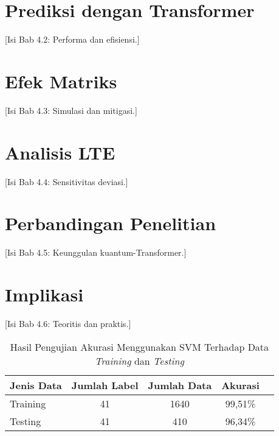 \section{Prediksi dengan Transformer}
[Isi Bab 4.2: Performa dan efisiensi.]

\section{Efek Matriks}
[Isi Bab 4.3: Simulasi dan mitigasi.]

\section{Analisis LTE}
[Isi Bab 4.4: Sensitivitas deviasi.]

\section{Perbandingan Penelitian}
[Isi Bab 4.5: Keunggulan kuantum-Transformer.]

\section{Implikasi}
[Isi Bab 4.6: Teoritis dan praktis.]


\begin{table}[H]
    \centering
    \caption{Hasil Pengujian Akurasi Menggunakan SVM Terhadap Data \textit{Training} dan \textit{Testing}}
    \label{tb_detail_akurasi_face}
    \begin{tabular}{lcccc}
    \toprule
    \textbf{Jenis Data} & \textbf{Jumlah Label} & \textbf{Jumlah Data} & {\color[HTML]{000000} \textbf{Akurasi}} \\ 
    \midrule
    {\color[HTML]{000000} Training} & {\color[HTML]{000000} 41} & {\color[HTML]{000000} 1640} & {\color[HTML]{000000} 99,51\%} \\ 
    {\color[HTML]{000000} Testing} & {\color[HTML]{000000} 41} & {\color[HTML]{000000} 410} & {\color[HTML]{000000} 96,34\%} \\ 
    \bottomrule
    \end{tabular}
    \end{table}

